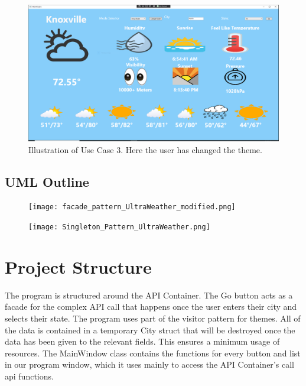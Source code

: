 \documentclass[10pt,conference,onecolumn,compsoc]{IEEEtran}
\begin{document}
\begin{figure}[ht!]
\includegraphics[scale=0.1]{use_case_3.png}
\caption{Illustration of Use Case 3. Here the user has changed the theme.}
\label{use_case_3}
\end{figure}

\subsection{UML Outline}
\begin{figure}[ht!]
\texttt{[image: facade\_pattern\_UltraWeather\_modified.png]}
\end{figure}

\begin{figure}[ht!]
\texttt{[image: Singleton\_Pattern\_UltraWeather.png]}
\end{figure}

\section{Project Structure}
The program is structured around the API Container. The Go button acts as a facade for the complex API call that happens once the user enters their city and selects their state. The program uses part of the visitor pattern for themes. All of the data is contained in a temporary City struct that will be destroyed once the data has been given to the relevant fields. This ensures a minimum usage of resources.
The MainWindow class contains the functions for every button and list in our program window, which it uses mainly to access the API Container's call api functions.
\end{document}
